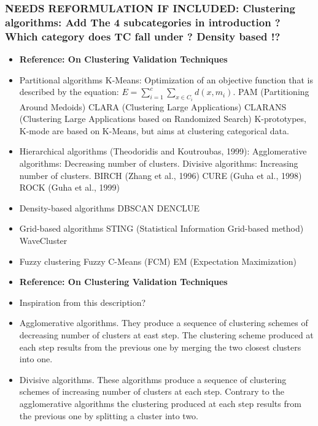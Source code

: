 \documentclass[a4paper,10pt]{article}
\theoremstyle{plain}
\theoremstyle{definition}
\begin{document}
\subsubsection{NEEDS REFORMULATION IF INCLUDED: Clustering algorithms: Add The 4 subcategories in introduction ? Which category does TC fall under ? Density based !?}
\begin{itemize}
	\item \textbf{Reference: On Clustering Validation Techniques}
	\item Partitional algorithms
		\subitem K-Means: Optimization of an objective function that is described by the equation: $E = \sum_{i = 1}^{c} \sum_{x \in C_{i}} d(x, m_{i})$.
		\subitem PAM (Partitioning Around Medoids)
		\subitem CLARA (Clustering Large Applications)
		\subitem CLARANS (Clustering Large Applications based on Randomized Search)
		\subitem K-prototypes, K-mode are based on K-Means, but aims at clustering categorical data.
	\item Hierarchical algorithms (Theodoridis and Koutroubas, 1999):
		\subitem Agglomerative algorithms: Decreasing number of clusters.
		\subitem Divisive algorithms: Increasing number of clusters.
		\subitem BIRCH (Zhang et al., 1996)
		\subitem CURE (Guha et al., 1998)
		\subitem ROCK (Guha et al., 1999)
	\item Density-based algorithms
		\subitem DBSCAN
		\subitem DENCLUE
	\item Grid-based algorithms
		\subitem STING (Statistical Information Grid-based method)
		\subitem WaveCluster
	\item Fuzzy clustering
		\subitem Fuzzy C-Means (FCM)
		\subitem EM (Expectation Maximization)
\end{itemize}
\begin{itemize}
	\item \textbf{Reference: On Clustering Validation Techniques}
	\item Inspiration from this description?
	\item Agglomerative algorithms. They produce a sequence of clustering schemes of decreasing number of clusters at east step. The clustering scheme produced at each step results from the previous one by merging the two closest clusters into one.
	\item Divisive algorithms. These algorithms produce a sequence of clustering schemes of increasing number of clusters at each step. Contrary to the agglomerative algorithms the clustering produced at each step results from the previous one by splitting a cluster into two.
\end{itemize}
\end{document}
